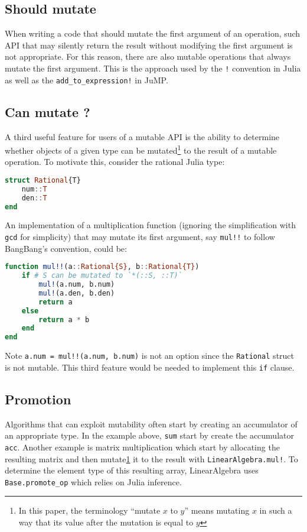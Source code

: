 \documentclass{juliacon}
\begin{document}
\subsection{Should mutate}
When writing a code that should mutate the first argument of an operation,
such API that may silently return the result without modifying the first argument is not appropriate.
For this reason, there are also mutable operations that always mutate the first argument.
This is the approach used by the \lstinline|!| convention in Julia
as well as the \lstinline|add_to_expression!| in JuMP.

\subsection{Can mutate ?}
A third useful feature for users of a mutable API is the ability to
determine whether objects of a given type can be mutated\footnote{\label{foot:mutate}In this paper, the terminology ``mutate $x$ to $y$'' means mutating $x$ in such a way that its value after the mutation is equal to $y$} to the result of a mutable operation.
To motivate this, consider the rational Julia type:
\begin{lstlisting}[language = Julia]
struct Rational{T}
    num::T
    den::T
end
\end{lstlisting}
An implementation of a multiplication function (ignoring the simplification with \lstinline|gcd| for simplicity) that may
mutate its first argument, say \lstinline|mul!!| to follow BangBang's convention,
could be:
\begin{lstlisting}[language = Julia]
function mul!!(a::Rational{S}, b::Rational{T})
    if # S can be mutated to `*(::S, ::T)`
        mul!(a.num, b.num)
        mul!(a.den, b.den)
        return a
    else
        return a * b
    end
end
\end{lstlisting}
Note \lstinline|a.num = mul!!(a.num, b.num)| is not an option since
the \lstinline|Rational| struct is not mutable.
This third feature would be needed to implement this \lstinline|if| clause.

\subsection{Promotion}
Algorithms that can exploit mutability often start by creating an accumulator of
an appropriate type.
In the example above, \lstinline|sum| start by create the accumulator \lstinline|acc|.
Another example is matrix multiplication which start by allocating the resulting matrix and then mutate\cref{foot:mutate} it to the result with \lstinline|LinearAlgebra.mul!|.
To determine the element type of this resulting array,
LinearAlgebra uses \lstinline|Base.promote_op| which relies on Julia inference.
\end{document}
